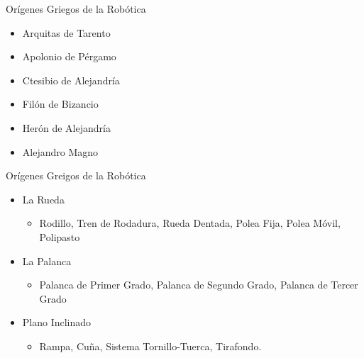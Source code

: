 
\begin{frame}[fragile]{Orígenes Griegos de la Robótica}
\vspace{8px}
\pause
{}
\begin{block}{}
	\begin{itemize}
		\item Arquitas de Tarento
		\pause
		\item Apolonio de Pérgamo
		\pause
		\item Ctesibio de Alejandría
		\pause
		\item Filón de Bizancio
		\pause
		\item Herón de Alejandría
		\pause
		\item Alejandro Magno
	\end{itemize}
\end{block}
\end{frame}


\begin{frame}[fragile]{Orígenes Greigos de la Robótica}
\vspace{8px}
\pause
{}
\begin{block}{}
	\begin{itemize}
		\item La Rueda
		\pause
			\begin{itemize}
				\item Rodillo, Tren de Rodadura, Rueda Dentada, Polea Fija, Polea Móvil, Polipasto
				\pause
			\end{itemize}
		\item La Palanca
		\pause
			\begin{itemize}
				\item Palanca de Primer Grado, Palanca de Segundo Grado, Palanca de Tercer Grado
				\pause
			\end{itemize}
		\item Plano Inclinado
		\pause
			\begin{itemize}
				\item Rampa, Cuña, Sistema Tornillo-Tuerca, Tirafondo.
			\end{itemize}
	\end{itemize}
\end{block}
\end{frame}

